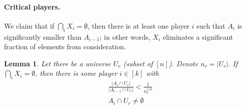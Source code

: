 \documentclass{article}
\theoremstyle{plain}
\newtheorem{lemma}[theorem]{Lemma}
\begin{document}
\paragraph{Critical players.}
We claim that if $\bigcap_i X_i = \emptyset$, then there is at least one player $i$ such that $A_i$ is significantly smaller than $A_{i - 1}$;
in other words, $X_i$ eliminates a significant fraction of elements from consideration.
\begin{lemma}
    Let there be a universe $U_r$ (subset of $[n]$). Denote $n_r = |U_r|$. \newline
  If $\bigcap_i X_i = \emptyset$,
  then there is some player $i \in [k]$
  with
  \begin{align}
    \frac{|A_{i} \cap U_r|}{|A_{i-1} \cap U_r|} < \frac{1}{n_r^{1/k}} \\
    A_{i} \cap U_r \neq \emptyset
  \end{align}
  \label{lemma:narrow}
\end{lemma}
\end{document}
